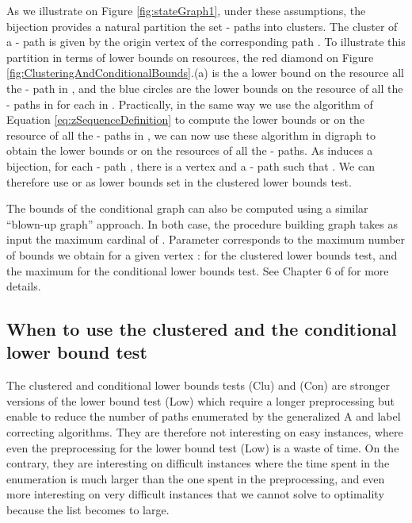 \documentclass[11pt]{amsart}
\theoremstyle{plain}
\theoremstyle{remark}
\begin{document}
As we illustrate on Figure \ref{fig:stateGraph1}, under these assumptions, the bijection  provides a natural partition the set - paths  into clusters. The cluster of a - path  is given by the origin vertex  of the corresponding path . To illustrate this partition in terms of lower bounds on resources, the red diamond on Figure \ref{fig:ClusteringAndConditionalBounds}.(a) is the a lower bound on the resource all the - path in , and the blue circles are the lower bounds on the resource of all the - paths in  for each  in . Practically, in the same way we use the algorithm of Equation \eqref{eq:zSequenceDefinition} to compute the lower bounds  or  on the resource of all the - paths in , we can now use these algorithm in digraph  to obtain the lower bounds  or  on the resources of all the - paths. 
As  induces a bijection, for each - path , there is a vertex  and a - path  such that . We can therefore use  or  as lower bounds set  in the clustered lower bounds test.

The bounds of the conditional graph can also be computed using a similar ``blown-up graph'' approach. In both case, the procedure building graph  takes as input the maximum cardinal  of . Parameter  corresponds to the maximum number of bounds we obtain for a given vertex :   for the clustered lower bounds test, and the maximum  for the conditional lower bounds test. See Chapter 6 of \cite{parmentier2016thesis} for more details.






























\subsection{When to use the clustered and the conditional lower bound test} \label{sub:choosing_between_the_clustered_and_the_conditional_lower_bound_test}


The clustered and conditional lower bounds tests (Clu) and (Con) are stronger versions of the lower bound test (Low) which require a longer preprocessing but enable to reduce the number of paths enumerated by the generalized A and label correcting algorithms. They are therefore not interesting on easy instances, where even the preprocessing for the lower bound test (Low) is a waste of time. On the contrary, they are interesting on difficult instances where the time spent in the enumeration is much larger than the one spent in the preprocessing, and even more interesting on very difficult instances that we cannot solve to optimality because the list  becomes to large. 
\end{document}
